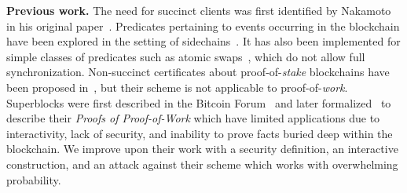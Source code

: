 \noindent
\textbf{Previous work.} The need for succinct clients was first identified by
Nakamoto in his original paper~\cite{bitcoin}. Predicates pertaining to events
occurring in the blockchain have been explored in the setting of
sidechains~\cite{sidechains}. It has
also been implemented for simple classes of predicates such as atomic
swaps~\cite{tiernolan,herlihy2018atomic}, which do not allow full
synchronization. Non-succinct certificates about proof-of-\emph{stake}
blockchains have been proposed in~\cite{gazi2019proof}, but their scheme is not
applicable to proof-of-\emph{work}. Superblocks were first described in the Bitcoin Forum~\cite{highway} and later formalized~\cite{KLS} to describe their \emph{Proofs of Proof-of-Work} which have limited applications due to interactivity, lack of security, and inability to prove facts buried deep within the blockchain. We improve upon their work with a security definition, an interactive construction, and an attack against their scheme which works with overwhelming probability.
